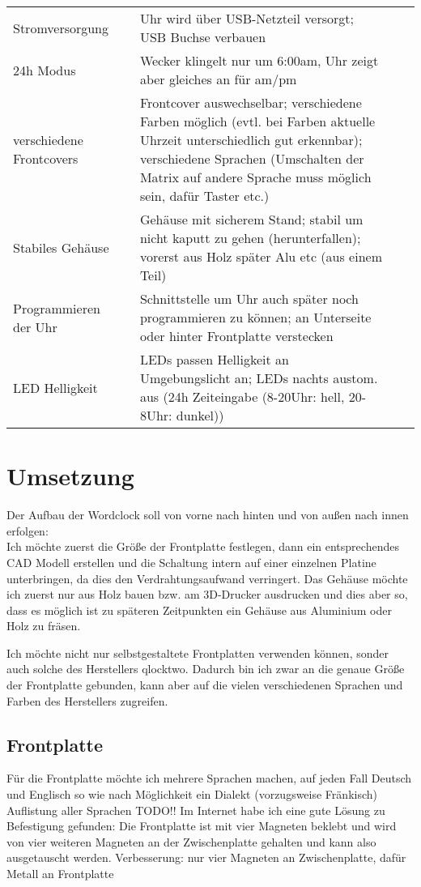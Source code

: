 \documentclass[11pt,a4paper,ngerman]{article}
\begin{document}
\begin{landscape}
\begin{tabular}[]{p{2cm}p{2cm}p{10cm}p{2cm}p{2cm}}
	Stromversorgung && Uhr wird über USB-Netzteil versorgt; USB Buchse verbauen \\
	24h Modus && Wecker klingelt nur um 6:00am, Uhr zeigt aber gleiches an für am/pm\\
	verschiedene Frontcovers & & Frontcover auswechselbar; verschiedene Farben möglich (evtl. bei Farben aktuelle Uhrzeit unterschiedlich gut erkennbar); verschiedene Sprachen (Umschalten der Matrix auf andere Sprache muss möglich sein, dafür Taster etc.)\\
	Stabiles Gehäuse & & Gehäuse mit sicherem Stand; stabil um nicht kaputt zu gehen (herunterfallen); vorerst aus Holz später Alu etc (aus einem Teil)\\
	Programmieren der Uhr && Schnittstelle um Uhr auch später noch programmieren zu können; an Unterseite oder hinter Frontplatte verstecken\\
	LED Helligkeit && LEDs passen Helligkeit an Umgebungslicht an; LEDs nachts austom. aus (24h Zeiteingabe (8-20Uhr: hell, 20-8Uhr: dunkel))

\end{tabular}
\end{landscape}

\section{Umsetzung}
	Der Aufbau der Wordclock soll von vorne nach hinten und von außen nach innen erfolgen:\\
	Ich möchte zuerst die Größe der Frontplatte festlegen, dann ein entsprechendes CAD Modell erstellen und die Schaltung intern auf einer einzelnen Platine unterbringen, da dies den Verdrahtungsaufwand verringert. Das Gehäuse möchte ich zuerst nur aus Holz bauen bzw. am 3D-Drucker ausdrucken und dies aber so, dass es möglich ist zu späteren Zeitpunkten ein Gehäuse aus Aluminium oder Holz zu fräsen. \par
	Ich möchte nicht nur selbstgestaltete Frontplatten verwenden können, sonder auch solche des Herstellers qlocktwo. Dadurch bin ich zwar an die genaue Größe der Frontplatte gebunden, kann aber auf die vielen verschiedenen Sprachen und Farben des Herstellers zugreifen. \par

\subsection{Frontplatte}
Für die Frontplatte möchte ich mehrere Sprachen machen, auf jeden Fall Deutsch und Englisch so wie nach Möglichkeit ein Dialekt (vorzugsweise Fränkisch)\\
Auflistung aller Sprachen TODO!!
Im Internet habe ich eine gute Lösung zu Befestigung gefunden: Die Frontplatte ist mit vier Magneten beklebt und  wird von vier weiteren Magneten an der Zwischenplatte gehalten und kann also ausgetauscht werden. Verbesserung: nur vier Magneten an Zwischenplatte, dafür Metall an Frontplatte
\end{document}
